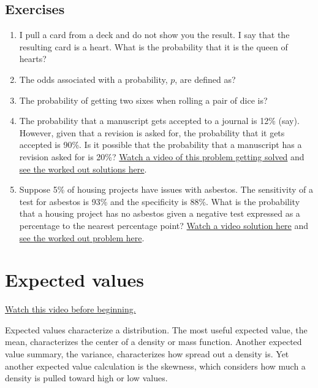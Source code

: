 \documentclass[]{article}
\begin{document}
\subsection{Exercises}\label{exercises-2}

\begin{enumerate}
\def\labelenumi{\arabic{enumi}.}
\itemsep1pt\parskip0pt
\item
  I pull a card from a deck and do not show you the result. I say that
  the resulting card is a heart. What is the probability that it is the
  queen of hearts?
\item
  The odds associated with a probability, $p$, are defined as?
\item
  The probability of getting two sixes when rolling a pair of dice is?
\item
  The probability that a manuscript gets accepted to a journal is 12\%
  (say). However, given that a revision is asked for, the probability
  that it gets accepted is 90\%. Is it possible that the probability
  that a manuscript has a revision asked for is 20\%?
  \href{http://youtu.be/E4kE4M1J15s?list=PLpl-gQkQivXhHOcVeU3bSJg78zaDYbP9L}{Watch
  a video of this problem getting solved} and
  \href{http://bcaffo.github.io/courses/06_StatisticalInference/homework/hw2.html\#3}{see
  the worked out solutions here}.
\item
  Suppose 5\% of housing projects have issues with asbestos. The
  sensitivity of a test for asbestos is 93\% and the specificity is
  88\%. What is the probability that a housing project has no asbestos
  given a negative test expressed as a percentage to the nearest
  percentage point?
  \href{https://www.youtube.com/watch?v=rbI97tSvGvQ\&list=PLpl-gQkQivXhHOcVeU3bSJg78zaDYbP9L\&index=11}{Watch
  a video solution here} and
  \href{http://bcaffo.github.io/courses/06_StatisticalInference/homework/hw2.html\#5}{see
  the worked out problem here}.
\end{enumerate}

\newpage

\section{Expected values}\label{expected-values}

\href{http://youtu.be/zljxRbu6jyc?list=PLpl-gQkQivXiBmGyzLrUjzsblmQsLtkzJ}{Watch
this video before beginning.}

Expected values characterize a distribution. The most useful expected
value, the mean, characterizes the center of a density or mass function.
Another expected value summary, the variance, characterizes how spread
out a density is. Yet another expected value calculation is the
skewness, which considers how much a density is pulled toward high or
low values.
\end{document}

